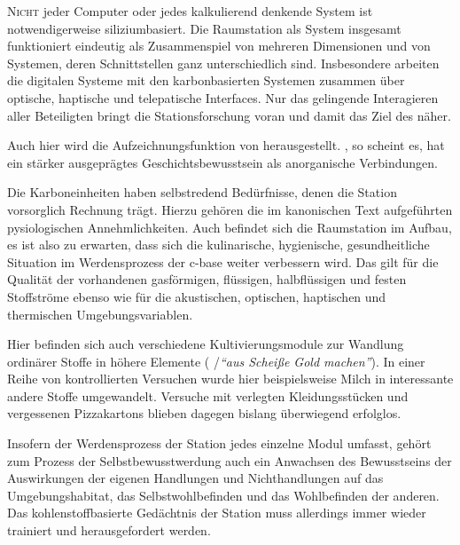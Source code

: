 \begin{newstuff}
    \lettrine{N}{icht} jeder Computer oder jedes kalkulierend denkende System ist notwendigerweise siliziumbasiert. Die Raumstation als System insgesamt funktioniert eindeutig als Zusammenspiel von mehreren Dimensionen und von Systemen, deren Schnittstellen ganz unterschiedlich sind. Insbesondere arbeiten die digitalen Systeme mit den karbonbasierten Systemen zusammen über optische, haptische und telepatische Interfaces. 
    Nur das gelingende Interagieren aller Beteiligten bringt die Stationsforschung voran und damit das Ziel des  näher.


    Auch hier wird die Aufzeichnungsfunktion von  herausgestellt. , so scheint es, hat ein stärker ausgeprägtes Geschichtsbewusstsein als anorganische Verbindungen.
    
    Die Karboneinheiten haben selbstredend Bedürfnisse, denen die Station vorsorglich Rechnung trägt.
    Hierzu gehören die im kanonischen Text aufgeführten pysiologischen Annehmlichkeiten. Auch befindet sich die  Raumstation im Aufbau, es ist also zu erwarten, dass sich die kulinarische, hygienische, gesundheitliche Situation im Werdensprozess der c-base weiter verbessern wird. Das gilt für die Qualität der vorhandenen gasförmigen, flüssigen, halbflüssigen und festen Stoffströme ebenso wie für die akustischen, optischen, haptischen und thermischen Umgebungsvariablen. 

    Hier befinden sich auch verschiedene Kultivierungsmodule zur Wandlung ordinärer Stoffe in höhere Elemente ( /\emph{"`aus Scheiße Gold machen"'}). In einer Reihe von kontrollierten Versuchen wurde hier beispielsweise Milch in interessante andere Stoffe umgewandelt. Versuche mit verlegten Kleidungsstücken und vergessenen \mbox{Pizza}\-kartons blieben dagegen bislang überwiegend erfolglos.
  
    Insofern der Werdensprozess der Station jedes einzelne Modul umfasst, gehört zum Prozess der Selbstbewusstwerdung auch ein Anwachsen des Bewusstseins der Auswirkungen der eigenen Handlungen und Nichthandlungen auf das Umgebungshabitat, das Selbstwohlbefinden und das Wohlbefinden der anderen. Das kohlenstoffbasierte Gedächtnis der Station muss allerdings immer wieder trainiert und herausgefordert werden.


\end{newstuff}
